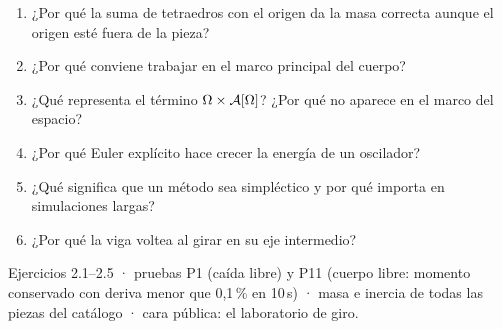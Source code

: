 \documentclass[11pt,a4paper]{article}
\begin{document}
\begin{control}
\begin{enumerate}[leftmargin=*]
  \item ¿Por qué la suma de tetraedros con el origen da la masa correcta aunque el origen esté fuera de la pieza?
  \item ¿Por qué conviene trabajar en el marco principal del cuerpo?
  \item ¿Qué representa el término $\Omega\times\mathcal{A}[\Omega]$? ¿Por qué no aparece en el marco del espacio?
  \item ¿Por qué Euler explícito hace crecer la energía de un oscilador?
  \item ¿Qué significa que un método sea simpléctico y por qué importa en simulaciones largas?
  \item ¿Por qué la viga voltea al girar en su eje intermedio?
\end{enumerate}
\end{control}

\begin{cierre}
Ejercicios 2.1--2.5 · pruebas P1 (caída libre) y P11 (cuerpo libre: momento conservado con deriva menor que 0{,}1\,\%
en 10\,s) · masa e inercia de todas las piezas del catálogo · cara pública: el laboratorio de giro.
\end{cierre}
\end{document}
